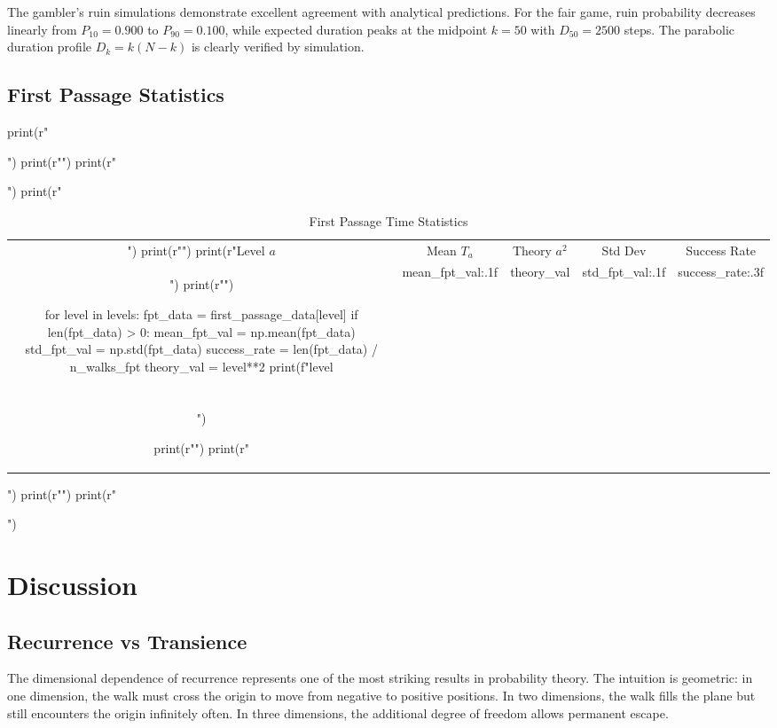 \documentclass[a4paper, 11pt]{article}
\begin{document}
The gambler's ruin simulations demonstrate excellent agreement with analytical predictions. For
the fair game, ruin probability decreases linearly from $P_{10} = 0.900$ to $P_{90} = 0.100$,
while expected duration peaks at the midpoint $k=50$ with $D_{50} = 2500$ steps. The parabolic
duration profile $D_k = k(N-k)$ is clearly verified by simulation.

\subsection{First Passage Statistics}

\begin{pycode}
print(r"\begin{table}[htbp]")
print(r"\centering")
print(r"\caption{First Passage Time Statistics}")
print(r"\begin{tabular}{ccccc}")
print(r"\toprule")
print(r"Level $a$ & Mean $T_a$ & Theory $a^2$ & Std Dev & Success Rate \\")
print(r"\midrule")

for level in levels:
    fpt_data = first_passage_data[level]
    if len(fpt_data) > 0:
        mean_fpt_val = np.mean(fpt_data)
        std_fpt_val = np.std(fpt_data)
        success_rate = len(fpt_data) / n_walks_fpt
        theory_val = level**2
        print(f"{level} & {mean_fpt_val:.1f} & {theory_val} & {std_fpt_val:.1f} & {success_rate:.3f} \\\\")

print(r"\bottomrule")
print(r"\end{tabular}")
print(r"\label{tab:fpt}")
print(r"\end{table}")
\end{pycode}

\section{Discussion}

\subsection{Recurrence vs Transience}

The dimensional dependence of recurrence represents one of the most striking results in probability
theory. The intuition is geometric: in one dimension, the walk must cross the origin to move from
negative to positive positions. In two dimensions, the walk fills the plane but still encounters
the origin infinitely often. In three dimensions, the additional degree of freedom allows permanent
escape.
\end{document}
